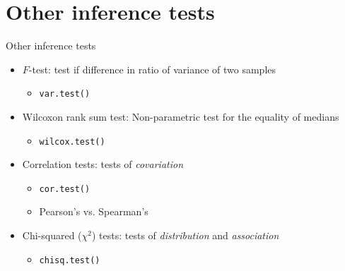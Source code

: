 \documentclass[aspectratio=169]{beamer}\usepackage[]{graphicx}\usepackage[]{color}
\begin{document}
\section{Other inference tests}
\begin{frame}{Other inference tests}
\begin{itemize}
  \item $F$-test: test if difference in ratio of variance of two samples
  \begin{itemize}
    \item \texttt{var.test()}
  \end{itemize}
  \item Wilcoxon rank sum test: Non-parametric test for the equality of medians 
  \begin{itemize}
    \item \texttt{wilcox.test()}
  \end{itemize}
  \item Correlation tests: tests of \emph{covariation}
  \begin{itemize}
    \item \texttt{cor.test()}
    \item Pearson's vs. Spearman's
  \end{itemize}
  \item Chi-squared ($\chi^2$) tests: tests of \emph{distribution} and \emph{association}
  \begin{itemize}
    \item \texttt{chisq.test()}
  \end{itemize}
\end{itemize}
\end{frame}

% 
\end{document}

